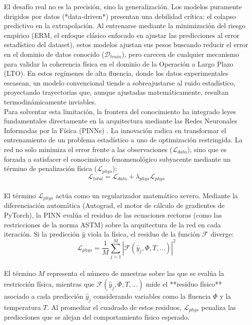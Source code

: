 \documentclass[a4paper, 12pt, twocolumn]{book}
\begin{document}
El desafío real no es la precisión, sino la generalización. Los modelos puramente dirigidos por datos (*data-driven*) presentan una debilidad crítica: el colapso predictivo en la extrapolación. Al entrenarse mediante la minimización del riesgo empírico (ERM, el enfoque clásico enfocado en ajustar las predicciones al error estadístico del dataset), estos modelos ajustan sus pesos buscando reducir el error en el dominio de datos conocido ($\mathcal{D}_{train}$), pero carecen de cualquier mecanismo para validar la coherencia física en el dominio de la Operación a Largo Plazo (LTO). En estos regímenes de alta fluencia, donde los datos experimentales escasean, un modelo convencional tiende a sobreajustarse al ruido estadístico, proyectando trayectorias que, aunque ajustadas matemáticamente, resultan termodinámicamente inviables.\\

Para solventar esta limitación, la frontera del conocimiento ha integrado leyes fundamentales directamente en la arquitectura mediante las Redes Neuronales Informadas por la Física (PINNs) \parencite{pang2020}. La innovación radica en transformar el entrenamiento de un problema estadístico a uno de optimización restringida. La red no solo minimiza el error frente a las observaciones ($\mathcal{L}_{data}$), sino que es forzada a satisfacer el conocimiento fenomenológico subyacente mediante un término de penalización física ($\mathcal{L}_{phys}$):\\
$$\mathcal{L}_{total} = \mathcal{L}_{data} + \lambda_{phys} \mathcal{L}_{phys}$$\\

El término $\mathcal{L}_{phys}$ actúa como un regularizador matemático severo. Mediante la diferenciación automática (Autograd, el motor de cálculo de gradientes de PyTorch), la PINN evalúa el residuo de las ecuaciones rectoras (como las restricciones de la norma ASTM) sobre la arquitectura de la red en cada iteración. Si la predicción $\hat{y}$ viola la física, el residuo de la función $\mathcal{F}$ diverge:\\

$$\mathcal{L}_{phys} = \frac{1}{M} \sum_{j=1}^{M} \left| \mathcal{F}(\hat{y}_j, \Phi, T, \dots) \right|^2$$\\

El término \(M\) representa el número de muestras sobre las que se evalúa la restricción física, mientras que \(\mathcal{F}(\hat{y}_j,\Phi,T,\ldots)\) mide el **residuo físico** asociado a cada predicción \(\hat{y}_j\) considerando variables como la fluencia \(\Phi\) y la temperatura \(T\). Al promediar el cuadrado de estos residuos, \(\mathcal{L}_{phys}\) penaliza las predicciones que se alejan del comportamiento físico esperado.\\
\end{document}
